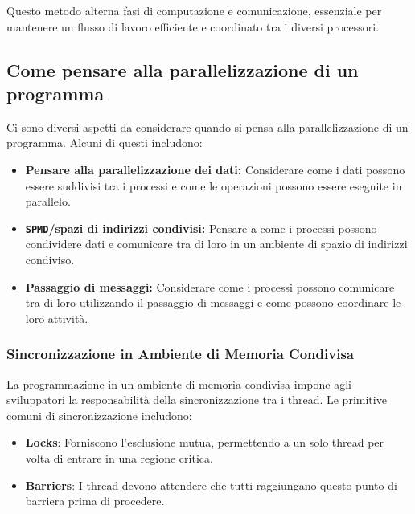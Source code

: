 Questo metodo alterna fasi di computazione e comunicazione, essenziale per
mantenere un flusso di lavoro efficiente e coordinato tra i diversi processori.

\subsection{Come pensare alla parallelizzazione di un programma}
Ci sono diversi aspetti da considerare quando si pensa alla parallelizzazione
di un programma. Alcuni di questi includono:
\begin{itemize}
    \item \textbf{Pensare alla parallelizzazione dei dati:} Considerare come
    i dati possono essere suddivisi tra i processi e come le operazioni
    possono essere eseguite in parallelo.
    \item \textbf{\texttt{SPMD}/spazi di indirizzi condivisi:} Pensare
    a come i processi possono condividere dati e comunicare tra di loro
    in un ambiente di spazio di indirizzi condiviso.
    \item \textbf{Passaggio di messaggi:} Considerare come i processi possono
    comunicare tra di loro utilizzando il passaggio di messaggi e come
    possono coordinare le loro attività.
\end{itemize}
\subsubsection{Sincronizzazione in Ambiente di Memoria Condivisa}
La programmazione in un ambiente di memoria condivisa impone agli sviluppatori la responsabilità della sincronizzazione tra i thread. Le primitive comuni di sincronizzazione includono:
\begin{itemize}
    \item \textbf{Locks}: Forniscono l'esclusione mutua, permettendo a un solo thread per volta di entrare in una regione critica.
    \item \textbf{Barriers}: I thread devono attendere che tutti raggiungano questo punto di barriera prima di procedere.
\end{itemize}

